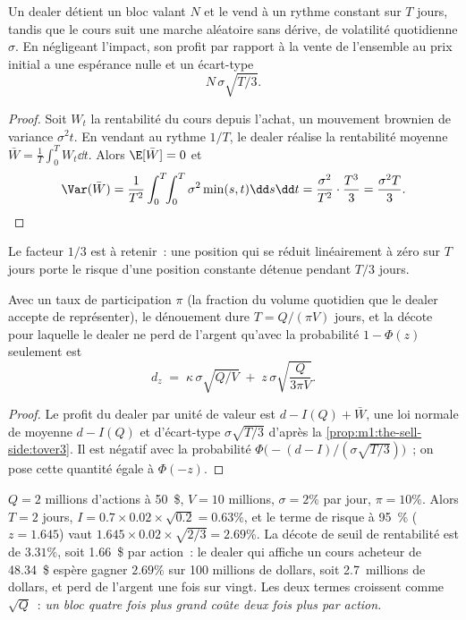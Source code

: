 \begin{proposition}\label{prop:m1:the-sell-side:tover3}
Un dealer détient un bloc valant $N$ et le vend à un rythme constant sur $T$
jours, tandis que le cours suit une marche aléatoire sans dérive, de volatilité quotidienne
$\sigma$. En négligeant l'impact, son profit par rapport à la vente de l'ensemble au
prix initial a une espérance nulle et un écart-type
\[
  N\,\sigma\sqrt{T/3}.
\]
\end{proposition}
\begin{proof}
Soit $W_t$ la rentabilité du cours depuis l'achat, un mouvement brownien de
variance $\sigma^2 t$. En vendant au rythme $1/T$, le dealer réalise la rentabilité
moyenne $\bar W = \frac1T\int_0^T W_t\dd t$. Alors $\E[\bar W]=0$ et
\[
\Var(\bar W) = \frac{1}{T^2}\int_0^T\!\!\int_0^T \sigma^2 \min(s,t)\dd s\dd t
 = \frac{\sigma^2}{T^2}\cdot\frac{T^3}{3} = \frac{\sigma^2 T}{3}.
\qedhere
\]
\end{proof}

Le facteur $1/3$ est à retenir~: une position qui se réduit linéairement à
zéro sur $T$ jours porte le risque d'une position constante détenue pendant $T/3$
jours.

\begin{proposition}\label{prop:m1:the-sell-side:discount}
Avec un taux de participation $\pi$ (la fraction du volume quotidien que le dealer accepte
de représenter), le dénouement dure $T = Q/(\pi V)$ jours, et la décote pour laquelle le dealer
ne perd de l'argent qu'avec la probabilité $1-\Phi(z)$ seulement est
\[
  d_z \;=\; \kappa\,\sigma\sqrt{Q/V} \;+\; z\,\sigma\sqrt{\frac{Q}{3\pi V}} .
\]
\end{proposition}
\begin{proof}
Le profit du dealer par unité de valeur est $d - I(Q) + \bar W$, une loi normale de
moyenne $d - I(Q)$ et d'écart-type $\sigma\sqrt{T/3}$ d'après la
\cref{prop:m1:the-sell-side:tover3}. Il est négatif avec la probabilité
$\Phi\bigl(-(d-I)/(\sigma\sqrt{T/3})\bigr)$~; on pose cette quantité égale à $\Phi(-z)$.
\end{proof}

\begin{example}\label{ex:m1:the-sell-side:block}
$Q = 2$ millions d'actions à 50~\$, $V = 10$ millions, $\sigma = 2\%$ par jour,
$\pi = 10\%$. Alors $T = 2$ jours, $I = 0.7 \times 0.02 \times \sqrt{0.2} =
0.63\%$, et le terme de risque à 95~\% ($z = 1.645$) vaut $1.645 \times 0.02
\times \sqrt{2/3} = 2.69\%$. La décote de seuil de rentabilité est de $3.31\%$, soit 1.66~\$ par
action~: le dealer qui affiche un cours acheteur de 48.34~\$ espère gagner $2.69\%$ sur 100
millions de dollars, soit 2.7~millions de dollars, et perd de l'argent une fois sur vingt. Les deux termes croissent
comme $\sqrt{Q}$~: \emph{un bloc quatre fois plus grand coûte deux fois plus par
action.}
\end{example}

